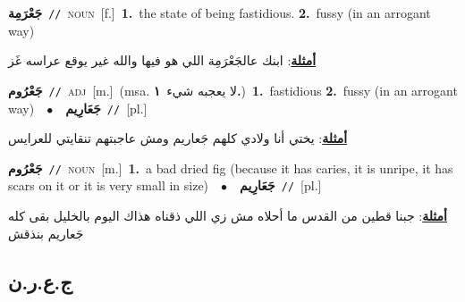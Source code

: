 \documentclass[10pt,a4paper,twoside]{article} %
\begin{document}
\begin{multicols}{2}
{\setlength\topsep{0pt}\textbf{\foreignlanguage{arabic}{جَعْرَمِة}}\ {\color{gray}\texttt{//}\color{black}}\ \textsc{noun}\ [f.]\ \textbf{1.}~the state of being fastidious.  \textbf{2.}~fussy (in an arrogant way)\  \begin{flushright}\color{gray}\foreignlanguage{arabic}{\textbf{\underline{\foreignlanguage{arabic}{أمثلة}}}: ابنك عالجَعْرَمِة اللي هو فيها والله غير يوقع عراسه غَز}\end{flushright}\color{black}} \vspace{2mm}

{\setlength\topsep{0pt}\textbf{\foreignlanguage{arabic}{جَعْرُوم}}\ {\color{gray}\texttt{//}\color{black}}\ \textsc{adj}\ [m.]\ \color{gray}(msa. \foreignlanguage{arabic}{لا يعجبه شيء}~\foreignlanguage{arabic}{\textbf{١.}})\color{black}\ \textbf{1.}~fastidious  \textbf{2.}~fussy (in an arrogant way)\ \ $\bullet$\ \ \setlength\topsep{0pt}\textbf{\foreignlanguage{arabic}{جَعَارِيم}}\ {\color{gray}\texttt{//}\color{black}}\ [pl.]\  \begin{flushright}\color{gray}\foreignlanguage{arabic}{\textbf{\underline{\foreignlanguage{arabic}{أمثلة}}}: يختي أنا ولادي كلهم جَعاريم ومش عاجبتهم تنقايتي للعرايس}\end{flushright}\color{black}} \vspace{2mm}

{\setlength\topsep{0pt}\textbf{\foreignlanguage{arabic}{جَعْرُوم}}\ {\color{gray}\texttt{//}\color{black}}\ \textsc{noun}\ [m.]\ \textbf{1.}~a bad dried fig (because it has caries, it is unripe, it has scars on it or it is very small in size)\ \ $\bullet$\ \ \setlength\topsep{0pt}\textbf{\foreignlanguage{arabic}{جَعَارِيم}}\ {\color{gray}\texttt{//}\color{black}}\ [pl.]\  \begin{flushright}\color{gray}\foreignlanguage{arabic}{\textbf{\underline{\foreignlanguage{arabic}{أمثلة}}}: جبنا قطين من القدس ما أحلاه مش زي اللي ذقناه هذاك اليوم بالخليل بقى كله جَعاريم بنذقش}\end{flushright}\color{black}} \vspace{2mm}

\vspace{-3mm}
\subsection*{\color{blue}\foreignlanguage{arabic}{ج.ع.ر.ن}\color{blue}{}} 


\end{multicols}
\end{document}
